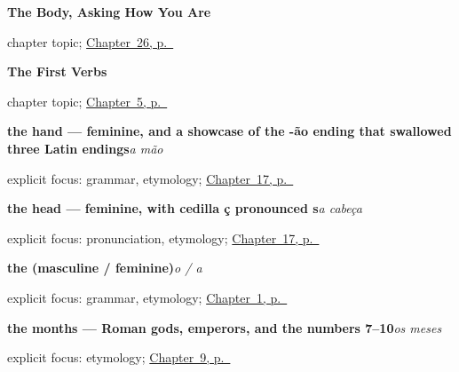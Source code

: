 \noindent\begin{minipage}[t]{\linewidth}
\raggedright
\textbf{The Body, Asking How You Are}\par
\footnotesize chapter topic; \hyperref[ch:pt-body-how-are-you]{Chapter~26, p.~\pageref*{ch:pt-body-how-are-you}}
\end{minipage}\par\smallskip

\noindent\begin{minipage}[t]{\linewidth}
\raggedright
\textbf{The First Verbs}\par
\footnotesize chapter topic; \hyperref[ch:pt-first-verbs]{Chapter~5, p.~\pageref*{ch:pt-first-verbs}}
\end{minipage}\par\smallskip

\noindent\begin{minipage}[t]{\linewidth}
\raggedright
\textbf{the hand — feminine, and a showcase of the -ão ending that swallowed three Latin endings}\enspace\emph{a mão}\par
\footnotesize explicit focus: grammar, etymology; \hyperref[ch:pt-head-and-hand]{Chapter~17, p.~\pageref*{ch:pt-head-and-hand}}
\end{minipage}\par\smallskip

\noindent\begin{minipage}[t]{\linewidth}
\raggedright
\textbf{the head — feminine, with cedilla ç pronounced s}\enspace\emph{a cabeça}\par
\footnotesize explicit focus: pronunciation, etymology; \hyperref[ch:pt-head-and-hand]{Chapter~17, p.~\pageref*{ch:pt-head-and-hand}}
\end{minipage}\par\smallskip

\noindent\begin{minipage}[t]{\linewidth}
\raggedright
\textbf{the (masculine / feminine)}\enspace\emph{o / a}\par
\footnotesize explicit focus: grammar, etymology; \hyperref[ch:greetings]{Chapter~1, p.~\pageref*{ch:greetings}}
\end{minipage}\par\smallskip

\noindent\begin{minipage}[t]{\linewidth}
\raggedright
\textbf{the months — Roman gods, emperors, and the numbers 7–10}\enspace\emph{os meses}\par
\footnotesize explicit focus: etymology; \hyperref[ch:pt-months-and-seasons]{Chapter~9, p.~\pageref*{ch:pt-months-and-seasons}}
\end{minipage}\par\smallskip

